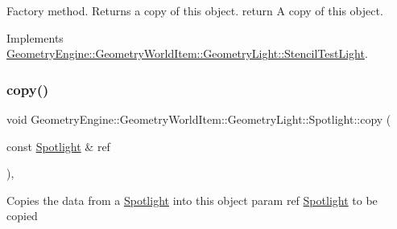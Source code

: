 Factory method. Returns a copy of this object. return A copy of this object. 

Implements \mbox{\hyperlink{class_geometry_engine_1_1_geometry_world_item_1_1_geometry_light_1_1_stencil_test_light_a6434a228dc64537ff9984c82eaf8ab07}{Geometry\+Engine\+::\+Geometry\+World\+Item\+::\+Geometry\+Light\+::\+Stencil\+Test\+Light}}.

\mbox{\label{class_geometry_engine_1_1_geometry_world_item_1_1_geometry_light_1_1_spotlight_a72de80e80891832884e039beec532e19}} 
\subsubsection{\texorpdfstring{copy()}{copy()}}
{\footnotesize\ttfamily void Geometry\+Engine\+::\+Geometry\+World\+Item\+::\+Geometry\+Light\+::\+Spotlight\+::copy (\begin{DoxyParamCaption}\item[{const \mbox{\hyperlink{class_geometry_engine_1_1_geometry_world_item_1_1_geometry_light_1_1_spotlight}{Spotlight}} \&}]{ref }\end{DoxyParamCaption})\hspace{0.3cm}{\ttfamily [protected]}, {\ttfamily [virtual]}}

Copies the data from a \mbox{\hyperlink{class_geometry_engine_1_1_geometry_world_item_1_1_geometry_light_1_1_spotlight}{Spotlight}} into this object param ref \mbox{\hyperlink{class_geometry_engine_1_1_geometry_world_item_1_1_geometry_light_1_1_spotlight}{Spotlight}} to be copied \mbox{\label{class_geometry_engine_1_1_geometry_world_item_1_1_geometry_light_1_1_spotlight_a89686934756cc47dd810cc43d8f5f88a}} 
